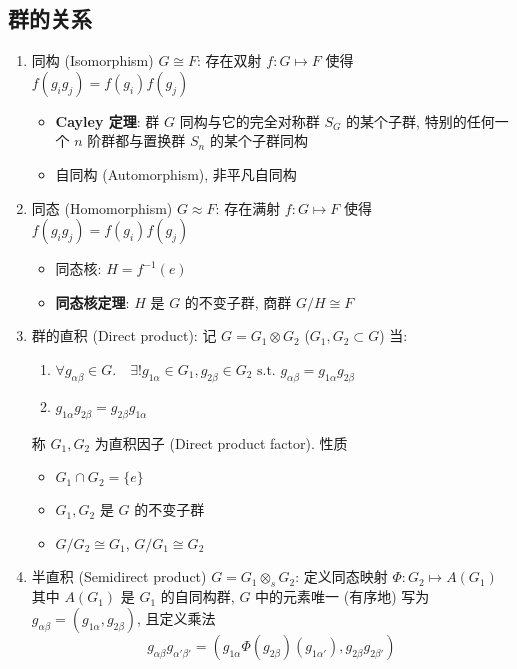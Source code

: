 \documentclass[12pt,a4paper]{article}%
\numberwithin{equation}{section}%
\begin{document}
\subsection{群的关系} %
\label{sub:relation}
\begin{enumerate}
	\item 同构 (Isomorphism) $G\cong F$: 存在双射 $f: G\mapsto F$ 使得 $f(g_ig_j) = f(g_i)f(g_j)$
	\begin{itemize}
		\item \textbf{Cayley 定理}: 群 $G$ 同构与它的完全对称群 $S_G$ 的某个子群, 特别的任何一个 $n$ 阶群都与置换群 $S_n$ 的某个子群同构
		\item 自同构 (Automorphism), 非平凡自同构
	\end{itemize}
	\item 同态 (Homomorphism) $G\approx F$: 存在满射 $f: G\mapsto F$ 使得 $f(g_ig_j) = f(g_i)f(g_j)$
	\begin{itemize}
		\item 同态核: $H = f^{-1}(e)$
		\item \textbf{同态核定理}: $H$ 是 $G$ 的不变子群, 商群 $G/H\cong F$
	\end{itemize}
	\item 群的直积 (Direct product): 记 $G = G_1\otimes G_2$ ($G_1, G_2\subset G$) 当:
	\begin{enumerate}
		\item $\forall g_{\alpha\beta}\in G.\quad \exists!g_{1\alpha}\in G_1, g_{2\beta}\in G_2 \mbox{ s.t. } g_{\alpha\beta} = g_{1\alpha}g_{2\beta}$
		\item $g_{1\alpha}g_{2\beta} = g_{2\beta}g_{1\alpha}$
	\end{enumerate}
	称 $G_1, G_2$ 为直积因子 (Direct product factor). 性质
	\begin{itemize}
		\item $G_1\cap G_2 = \{e\}$
		\item $G_1, G_2$ 是 $G$ 的不变子群
		\item $G/G_2\cong G_1$, $G/G_1\cong G_2$ 
	\end{itemize}
	\item 半直积 (Semidirect product) $G = G_1\otimes_s G_2$: 定义同态映射 $\Phi:G_2\mapsto A(G_1)$ 其中 $A(G_1)$ 是 $G_1$ 的自同构群, $G$ 中的元素唯一 (有序地) 写为 $g_{\alpha\beta} =  (g_{1\alpha}, g_{2\beta})$, 且定义乘法
	\begin{equation}
		g_{\alpha\beta}g_{\alpha'\beta'} =  (g_{1\alpha}\Phi(g_{2\beta})(g_{1\alpha'}),g_{2\beta}g_{2\beta'})
	\end{equation}
\end{enumerate}
\end{document}
